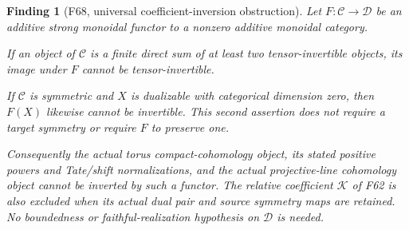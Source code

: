 \documentclass[11pt,a4paper]{article}
\newcommand{\fid}[1]{\textsf{#1}}\newcommand{\gate}[1]{\textsf{#1}}
\theoremstyle{named}\newtheorem{finding}{Finding}[section]
\theoremstyle{definition}\newtheorem{definition}[finding]{Definition}
\theoremstyle{remark}\newtheorem{remark}[finding]{Remark}
\begin{document}
\begin{finding}[\fid{F68}, universal coefficient-inversion obstruction]
\label{f:universalCoefficientInversion}
Let \(F:\mathcal C\to\mathcal D\) be an additive
strong monoidal functor to a nonzero additive
monoidal category.

If an object of \(\mathcal C\) is a finite direct
sum of at least two tensor-invertible objects,
its image under \(F\) cannot be tensor-invertible.

If \(\mathcal C\) is symmetric and \(X\) is
dualizable with categorical dimension zero, then
\(F(X)\) likewise cannot be invertible.
This second assertion does not require a target
symmetry or require \(F\) to preserve one.

Consequently the actual torus compact-cohomology
object, its stated positive powers and Tate/shift
normalizations, and the actual projective-line
cohomology object cannot be inverted by such a functor.
The relative coefficient \(\mathcal K\) of
\fid{F62} is also excluded when its actual dual
pair and source symmetry maps are retained.
No boundedness or faithful-realization hypothesis
on \(\mathcal D\) is needed.
\end{finding}
\end{document}
